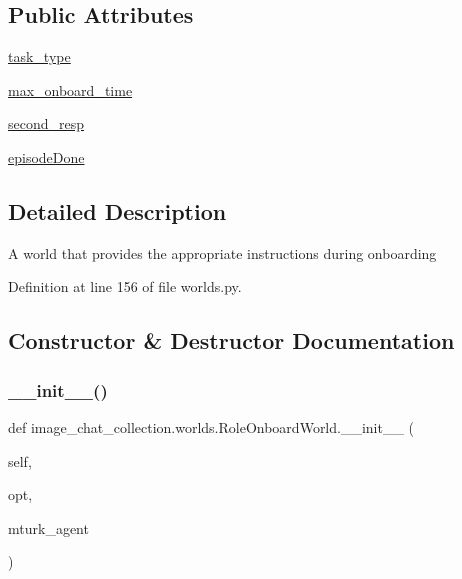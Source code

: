 \subsection*{Public Attributes}
\begin{DoxyCompactItemize}
\item 
\hyperlink{classimage__chat__collection_1_1worlds_1_1RoleOnboardWorld_ad9ed130b4de7849a205afa0d2e0881ab}{task\+\_\+type}
\item 
\hyperlink{classimage__chat__collection_1_1worlds_1_1RoleOnboardWorld_a01964521ee7db1f4fab890a88f0d1940}{max\+\_\+onboard\+\_\+time}
\item 
\hyperlink{classimage__chat__collection_1_1worlds_1_1RoleOnboardWorld_aae14ab21837d108894456e35c150f1fa}{second\+\_\+resp}
\item 
\hyperlink{classimage__chat__collection_1_1worlds_1_1RoleOnboardWorld_a5f75149b8c759e83c23b1e39ed2d5dbb}{episode\+Done}
\end{DoxyCompactItemize}


\subsection{Detailed Description}
\begin{DoxyVerb}A world that provides the appropriate instructions during onboarding\end{DoxyVerb}
 

Definition at line 156 of file worlds.\+py.



\subsection{Constructor \& Destructor Documentation}
\mbox{\label{classimage__chat__collection_1_1worlds_1_1RoleOnboardWorld_abc1062c3b8465f56b06b8173925d117d}} 
\subsubsection{\texorpdfstring{\+\_\+\+\_\+init\+\_\+\+\_\+()}{\_\_init\_\_()}}
{\footnotesize\ttfamily def image\+\_\+chat\+\_\+collection.\+worlds.\+Role\+Onboard\+World.\+\_\+\+\_\+init\+\_\+\+\_\+ (\begin{DoxyParamCaption}\item[{}]{self,  }\item[{}]{opt,  }\item[{}]{mturk\+\_\+agent }\end{DoxyParamCaption})}



